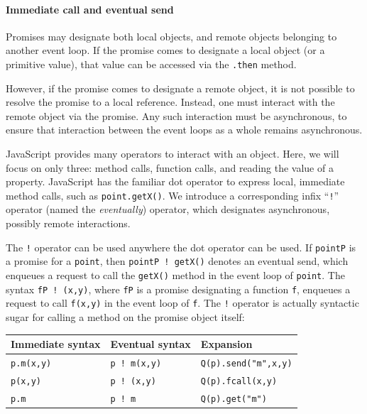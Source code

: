 \documentclass{llncs}
\begin{document}
\paragraph{Immediate call and eventual send}

Promises may designate both local objects, and remote objects belonging to another event loop. If the promise comes to designate a local object (or a primitive value), that value can be accessed via the {\tt .then} method.

However, if the promise comes to designate a remote object, it is not possible to resolve the promise to a local reference. Instead, one must interact with the remote object via the promise. Any such interaction must be asynchronous, to ensure that interaction between the event loops as a whole remains asynchronous.

JavaScript provides many operators to interact with an object. Here, we will focus on only three: method calls, function calls, and reading the value of a property. JavaScript has the familiar dot operator to express local, immediate method calls, such as {\tt point.getX()}. We introduce a corresponding infix ``{\tt !}'' operator (named the \emph{eventually}) operator, which designates asynchronous, possibly remote interactions.

The {\tt !} operator can be used anywhere the dot operator can be used. If {\tt pointP} is a promise for a {\tt point}, then {\tt pointP~!~getX()} denotes an eventual send, which enqueues a request to call the {\tt getX()} method in the event loop of {\tt point}. The syntax {\tt fP~!~(x,y)}, where {\tt fP} is a promise designating a function {\tt f}, enqueues a request to call {\tt f(x,y)} in the event loop of {\tt f}. The {\tt !} operator is actually syntactic sugar for calling a method on the promise object itself:

\begin{center}
  \begin{tabular}{ l @{\hskip 12pt} l @{\hskip 12pt} l }
  Immediate syntax & Eventual syntax & Expansion \\
  \hline
  {\tt p.m(x,y)} & {\tt p ! m(x,y)} & {\tt Q(p).send("m",x,y)} \\
  {\tt p(x,y)} & {\tt p ! (x,y)} & {\tt Q(p).fcall(x,y)}\\
  {\tt p.m} & {\tt p ! m} & {\tt Q(p).get("m")}\\
  \end{tabular} 
\end{center}
\end{document}
